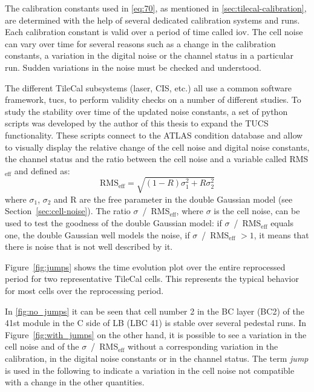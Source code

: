 The calibration constants used in \cref{eq:70}, as mentioned in
\cref{sec:tilecal-calibration}, are determined with the help of several
dedicated calibration systems and runs. Each calibration constant is valid over
a period of time called \gls{iov}. The cell noise can vary over time for several
reasons such as a change in the calibration constants, a variation in the
digital noise or the channel status in a particular run. Sudden variations in
the noise must be checked and understood.

The different TileCal subsystems (laser, CIS, etc.) all use a common software
framework, \gls{tucs}, to perform validity checks on a number of different
studies. To study the stability over time of the updated noise constants, a set
of python scripts was developed by the author of this thesis to expand the TUCS
functionality. These scripts connect to the ATLAS condition database and allow
to visually display the relative change of the cell noise and digital noise
constants, the channel status and the ratio between the cell noise and a
variable called RMS$_\text{eff}$ and defined as:
\begin{equation}
  \label{eq:73}
  \text{RMS}_{\text{eff}} = \sqrt{(1 - R) \sigma_1^2 + R \sigma_2^2}
\end{equation}
where $\sigma_1$, $\sigma_2$ and R are the free parameter in the double Gaussian
model (see Section~\ref{sec:cell-noise}).  The ratio
$\sigma$~/~RMS$_\text{eff}$, where $\sigma$ is the cell noise, can be used to
test the goodness of the double Gaussian model: if $\sigma$~/~RMS$_\text{eff}$
equals one, the double Gaussian well models the noise, if
$\sigma$~/~RMS$_\text{eff}$ $> 1$, it means that there is noise that is not well
described by it.

Figure~\ref{fig:jumps} shows the time evolution plot over the entire reprocessed
period for two representative TileCal cells. This represents the typical
behavior for most cells over the reprocessing period.

In \cref{fig:no_jumps} it can be seen that cell number 2 in the BC layer (BC2)
of the 41st module in the C side of LB (LBC 41) is stable over several pedestal
runs. In Figure~\ref{fig:with_jumps} on the other hand, it is possible to see a
variation in the cell noise and of the $\sigma$~/~RMS$_{\text{eff}}$ without a
corresponding variation in the calibration, in the digital noise constants or in
the channel status. The term \emph{jump} is used in the following to indicate a
variation in the cell noise not compatible with a change in the other
quantities.

